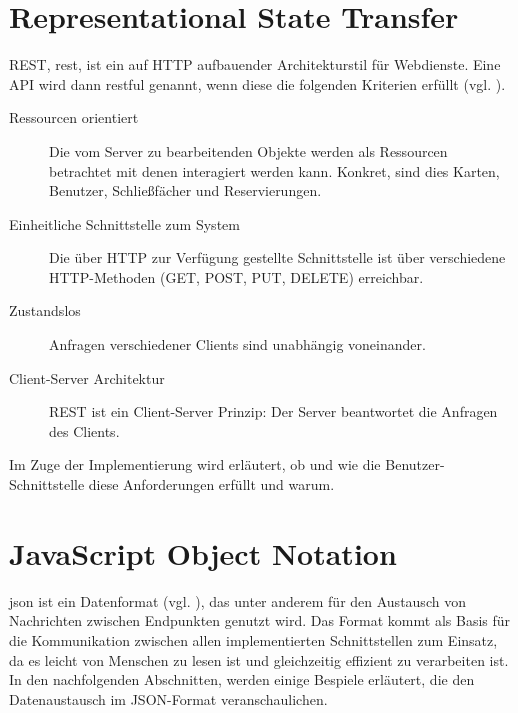 \section{Representational State Transfer}\label{sec:theory:rest}
REST, \acrlong{rest}, ist ein auf HTTP aufbauender Architekturstil für Webdienste. Eine API wird dann \acrshort{restful} genannt, wenn diese die folgenden Kriterien erfüllt (vgl. \cite{src:redhat:rest}).
\begin{description}
\item[Ressourcen orientiert] Die vom Server zu bearbeitenden Objekte werden als Ressourcen betrachtet mit denen interagiert werden kann. Konkret, sind dies Karten, Benutzer, Schließfächer und Reservierungen.
\item[Einheitliche Schnittstelle zum System] Die über HTTP zur Verfügung gestellte Schnittstelle ist über verschiedene HTTP-Methoden (GET, POST, PUT, DELETE) erreichbar.
\item[Zustandslos] Anfragen verschiedener Clients sind unabhängig voneinander. 
\item[Client-Server Architektur] REST ist ein Client-Server Prinzip: Der Server beantwortet die Anfragen des Clients.
\end{description}
Im Zuge der Implementierung wird erläutert, ob und wie die Benutzer-Schnittstelle diese Anforderungen erfüllt und warum.

\section{JavaScript Object Notation}\label{sec:theory:json}
\acrshort{json} ist ein Datenformat (vgl. \cite{src:json:org}), das unter anderem für den Austausch von Nachrichten zwischen Endpunkten genutzt wird. Das Format kommt als Basis für die Kommunikation zwischen allen implementierten Schnittstellen zum Einsatz, da es leicht von Menschen zu lesen ist und gleichzeitig effizient zu verarbeiten ist. In den nachfolgenden Abschnitten, werden einige Bespiele erläutert, die den Datenaustausch im JSON-Format veranschaulichen.

